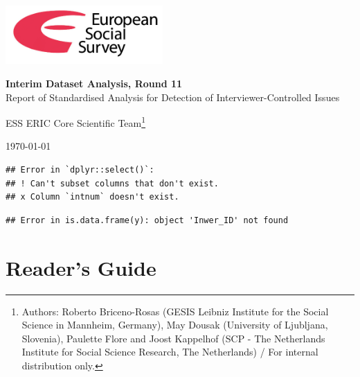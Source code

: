 \documentclass[
  11pt,
  a4paperpaper,
]{article}
\author{}
\date{\vspace{-2.5em}}
\let\stdsection\section
\renewcommand{\section}{\FloatBarrier\clearpage\FloatBarrier\stdsection}
\begin{document}
\newpage
\FloatBarrier
{}

\begin{titlepage}
    \raggedleft
    \includegraphics[width = 6cm]{ESSlogo.png}
    \vfill
    \raggedright
    {\bf \fontsize{40pt}{50pt}\selectfont Interim Dataset Analysis, Round 11}\\[1 cm]
    {\sc \fontsize{20pt}{30pt}\selectfont Report of Standardised Analysis for Detection of Interviewer-Controlled Issues}\\[1 cm]
    \vfill
    \begin{center}\large
    ESS ERIC Core Scientific Team\footnote[1]{Authors: Roberto Briceno-Rosas (GESIS Leibniz Institute for the Social Science in Mannheim, Germany), May Dousak (University of Ljubljana, Slovenia), Paulette Flore and Joost Kappelhof (SCP - The Netherlands Institute for Social Science Research, The Netherlands) / For internal distribution only.}
    \end{center}
    \begin{center}
    {\large \today}
    \end{center}
\end{titlepage}


\setcounter{tocdepth}{2}
\tableofcontents
\listoffigures

\begin{verbatim}
## Error in `dplyr::select()`:
## ! Can't subset columns that don't exist.
## x Column `intnum` doesn't exist.
\end{verbatim}

\begin{verbatim}
## Error in is.data.frame(y): object 'Inwer_ID' not found
\end{verbatim}

\hypertarget{readers-guide}{%
\section*{Reader's Guide}\label{readers-guide}}
\end{document}

